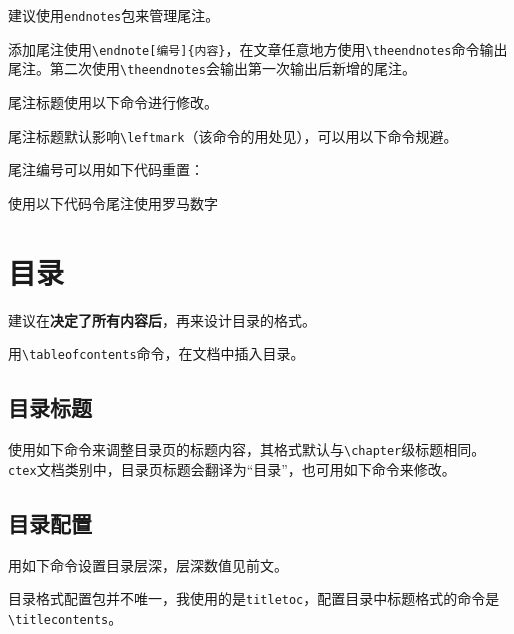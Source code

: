 \documentclass[10pt,openany]{book}
\begin{document}
\begin{sloppypar}
    建议使用\texttt{endnotes}包来管理尾注。

    添加尾注使用\texttt{\textbackslash{}endnote{[}编号{]}\{内容\}}，在文章任意地方使用\texttt{\textbackslash{}theendnotes}命令输出尾注。第二次使用\texttt{\textbackslash{}theendnotes}会输出第一次输出后新增的尾注。

    尾注标题使用以下命令进行修改。

    

    尾注标题默认影响\texttt{\textbackslash{}leftmark}（该命令的用处见\emph{}），可以用以下命令规避。

    

    尾注编号可以用如下代码重置：

    

    使用以下代码令尾注使用罗马数字

    

    \chapter{目录}

    建议在\textbf{决定了所有内容后}，再来设计目录的格式。

    用\texttt{\textbackslash{}tableofcontents}命令，在文档中插入目录。

    \section{目录标题}

    使用如下命令来调整目录页的标题内容，其格式默认与\texttt{\textbackslash{}chapter}级标题相同。\texttt{ctex}文档类别中，目录页标题会翻译为“目录”，也可用如下命令来修改。

    

    \section{目录配置}

    用如下命令设置目录层深，层深数值见前文。

    

    目录格式配置包并不唯一，我使用的是\texttt{titletoc}，配置目录中标题格式的命令是\texttt{\textbackslash{}titlecontents}。


\end{sloppypar}
\end{document}
